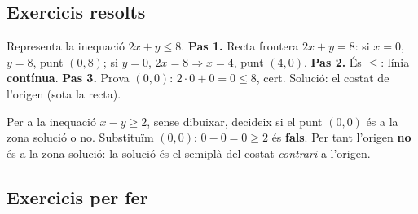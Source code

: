 \subsection{Exercicis resolts}

\begin{exresolt}
Representa la inequació $2x+y\le 8$.
\solucio
\textbf{Pas 1.} Recta frontera $2x+y=8$: si $x=0$, $y=8$, punt $(0,8)$; si $y=0$,
$2x=8 \Rightarrow x=4$, punt $(4,0)$. \textbf{Pas 2.} És $\le$: línia
\textbf{contínua}. \textbf{Pas 3.} Prova $(0,0)$: $2\cdot 0+0=0\le 8$, cert. Solució: el
costat de l'origen (sota la recta).

\begin{center}
\end{center}
\end{exresolt}

\begin{exresolt}
Per a la inequació $x-y\ge 2$, sense dibuixar, decideix si el punt $(0,0)$ és a la
zona solució o no.
\solucio
Substituïm $(0,0)$: $0-0=0\ge 2$ és \textbf{fals}. Per tant l'origen \textbf{no} és a
la zona solució: la solució és el semiplà del costat \emph{contrari} a l'origen.
\end{exresolt}

\subsection{Exercicis per fer}

